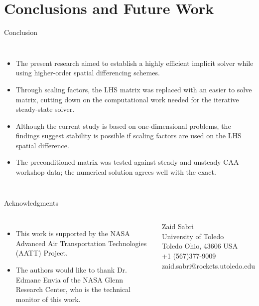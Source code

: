 \section{Conclusions and Future Work}
\begin{frame}{Conclusion}
\begin{columns}
        \begin{itemize}
        	\item The present research aimed to establish a highly efficient implicit solver while using higher-order spatial differencing schemes. 
        	\item Through scaling factors, the LHS matrix was replaced with an easier to solve matrix, cutting down on the computational work needed for the iterative steady-state solver. 
        	\item Although the current study is based on one-dimensional problems, the findings suggest stability is possible if scaling factors are used on the LHS spatial difference. 
        	\item The preconditioned matrix was tested against steady and unsteady CAA workshop data; the numerical solution agrees well with the exact.  
        \end{itemize}
    \end{columns}
\end{frame}

\begin{frame}{Acknowledgments}
\begin{columns}
        \begin{itemize}
        \item This work is supported by the NASA Advanced Air Transportation Technologies (AATT) Project. 
        \item The authors would like to thank Dr. Edmane Envia of the NASA Glenn Research Center, who is the technical monitor of this work.
        \end{itemize}
        \begin{block}{}
        	Zaid Sabri \\
        	University of Toledo \\
        	Toledo Ohio, 43606 USA \\
        	+1 (567)377-9009 \\
        	zaid.sabri@rockets.utoledo.edu
        \end{block}
    \end{columns}
\end{frame} 
    

